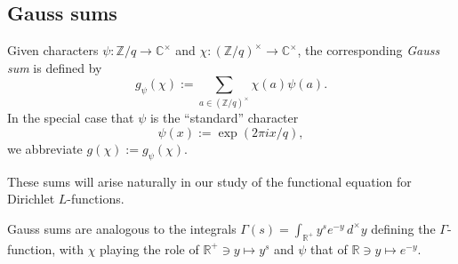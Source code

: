 \documentclass[reqno]{amsart}  \numberwithin{theorem}{section} \numberwithin{equation}{section}
\begin{document}
\subsection{Gauss sums}\label{sec:cj57ckemom}
Given characters $\psi : \mathbb{Z} / q \rightarrow \mathbb{C}^\times$ and $\chi : (\mathbb{Z} / q )^\times \rightarrow \mathbb{C}^\times$, the corresponding \emph{Gauss sum} is defined by
\begin{equation*}
  g_\psi (\chi ) := \sum_{a \in (\mathbb{Z} / q )^\times }
  \chi (a) \psi (a).
\end{equation*}
In the special case that $\psi$ is the ``standard'' character
\begin{equation}\label{eq:cj57b8om3u}
  \psi(x) := \exp (2 \pi i x / q),
\end{equation}
we abbreviate $g (\chi ) := g_\psi (\chi)$.

These sums will arise naturally in our study of the functional equation for Dirichlet $L$-functions.

\begin{remark}\label{remark:cj57ckekc3}
Gauss sums are analogous to the integrals $\Gamma(s) = \int_{\mathbb{R}^+ } y^s e^{- y } \,d^\times y$ defining the $\Gamma$-function, with $\chi$ playing the role of $\mathbb{R}^+ \ni y \mapsto y^s$ and $\psi$ that of $\mathbb{R} \ni y \mapsto e^{-y}$.  
\end{remark}
\end{document}
